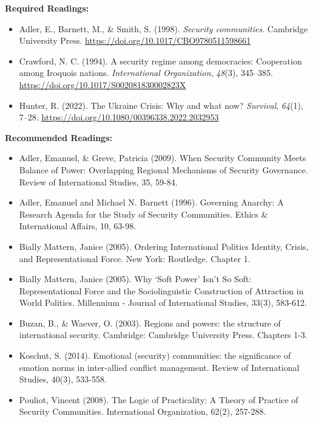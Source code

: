 \documentclass[
  letterpaper,
  DIV=11,
  numbers=noendperiod]{scrartcl}
\providecommand{\tightlist}{%
  \setlength{\itemsep}{0pt}\setlength{\parskip}{0pt}}\usepackage{longtable,booktabs,array}
\begin{document}
\textbf{Required Readings:}

\begin{itemize}
\tightlist
\item
  Adler, E., Barnett, M., \& Smith, S. (1998). \emph{Security
  communities}. Cambridge University Press.
  \url{https://doi.org/10.1017/CBO9780511598661}
\item
  Crawford, N. C. (1994). A security regime among democracies:
  Cooperation among {Iroquois} nations. \emph{International
  Organization}, \emph{48}(3), 345--385.
  \url{https://doi.org/10.1017/S002081830002823X}
\item
  Hunter, R. (2022). The {Ukraine} {Crisis}: Why and what now?
  \emph{Survival}, \emph{64}(1), 7--28.
  \url{https://doi.org/10.1080/00396338.2022.2032953}
\end{itemize}

\textbf{Recommended Readings:}

\begin{itemize}
\tightlist
\item
  Adler, Emanuel, \& Greve, Patricia (2009). When Security Community
  Meets Balance of Power: Overlapping Regional Mechanisms of Security
  Governance. Review of International Studies, 35, 59-84.
\item
  Adler, Emanuel and Michael N. Barnett (1996). Governing Anarchy: A
  Research Agenda for the Study of Security Communities. Ethics \&
  International Affairs, 10, 63-98.
\item
  Bially Mattern, Janice (2005). Ordering International Politics
  Identity, Crisis, and Representational Force. New York: Routledge.
  Chapter 1.
\item
  Bially Mattern, Janice (2005). Why `Soft Power' Isn't So Soft:
  Representational Force and the Sociolinguistic Construction of
  Attraction in World Politics. Millennium - Journal of International
  Studies, 33(3), 583-612.
\item
  Buzan, B., \& Waever, O. (2003). Regions and powers: the structure of
  international security. Cambridge: Cambridge University Press.
  Chapters 1-3.
\item
  Koschut, S. (2014). Emotional (security) communities: the significance
  of emotion norms in inter-allied conflict management. Review of
  International Studies, 40(3), 533-558.
\item
  Pouliot, Vincent (2008). The Logic of Practicality: A Theory of
  Practice of Security Communities. International Organization, 62(2),
  257-288.
\end{itemize}
\end{document}
